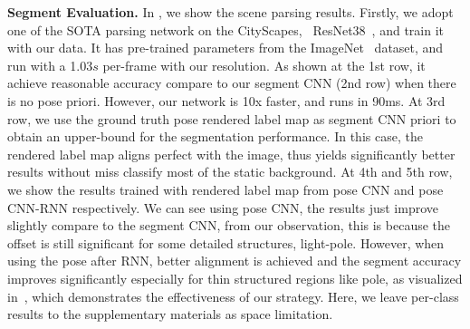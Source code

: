 \textbf{Segment Evaluation.}
In , we show the scene parsing results. 
Firstly, we adopt one of the SOTA parsing network on the CityScapes, \ie~ResNet38~\cite{WuSH16e}, and train it with our data. It has pre-trained parameters from the ImageNet~\cite{deng2009imagenet} dataset, and run with a 1.03$s$ per-frame with our resolution. As shown at the 1st row, it achieve reasonable accuracy compare to our segment CNN (2nd row) when there is no pose priori. However, our network is 10x faster, and runs in 90ms. 
At 3rd row, we use the ground truth pose rendered label map as segment CNN priori to obtain an upper-bound for the segmentation performance. 
In this case, the rendered label map aligns perfect with the image, thus yields significantly better results without miss classify most of the static background.
At 4th and 5th row, we show the results trained with rendered label map from pose CNN and pose CNN-RNN respectively. We can see using pose CNN, the results just improve slightly compare to the segment CNN, from our observation, this is because the offset is still significant for some detailed structures, \eg light-pole.
However, when using the pose after RNN, better alignment is achieved and the segment accuracy improves significantly especially for thin structured regions like pole, as visualized in~, which demonstrates the effectiveness of our strategy. 
Here, we leave per-class results to the supplementary materials as space limitation.



